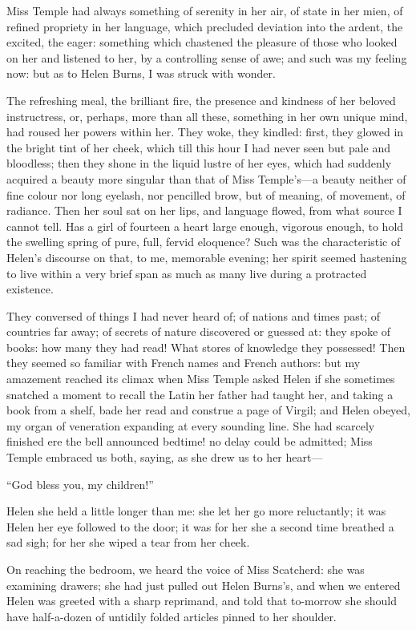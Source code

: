 Miss Temple had always something of serenity in her air, of state in her
mien, of refined propriety in her language, which precluded deviation
into the ardent, the excited, the eager: something which chastened the
pleasure of those who looked on her and listened to her, by a
controlling sense of awe; and such was my feeling now: but as to Helen
Burns, I was struck with wonder.

The refreshing meal, the brilliant fire, the presence and kindness of
her beloved instructress, or, perhaps, more than all these, something in
her own unique mind, had roused her powers within her. They woke, they
kindled: first, they glowed in the bright tint of her cheek, which till
this hour I had never seen but pale and bloodless; then they shone in
the liquid lustre of her eyes, which had suddenly acquired a beauty more
singular than that of Miss Temple's---a beauty neither of fine colour
nor long eyelash, nor pencilled brow, but of meaning, of movement, of
radiance. Then her soul sat on her lips, and language flowed, from what
source I cannot tell. Has a girl of fourteen a heart large enough,
vigorous enough, to hold the swelling spring of pure, full, fervid
eloquence? Such was the characteristic of Helen's discourse on that, to
me, memorable evening; her spirit seemed hastening to live within a very
brief span as much as many live during a protracted existence.

They conversed of things I had never heard of; of nations and times
past; of countries far away; of secrets of nature discovered or guessed
at: they spoke of books: how many they had read! What stores of
knowledge they possessed! Then they seemed so familiar with French
names and French authors: but my amazement reached its climax when Miss
Temple asked Helen if she sometimes snatched a moment to recall the
Latin her father had taught her, and taking a book from a shelf, bade
her read and construe a page of Virgil; and Helen obeyed, my organ of
veneration expanding at every sounding line. She had scarcely finished
ere the bell announced bedtime! no delay could be admitted; Miss Temple
embraced us both, saying, as she drew us to her heart---

\enquote{God bless you, my children!}

Helen she held a little longer than me: she let her go more reluctantly;
it was Helen her eye followed to the door; it was for her she a second
time breathed a sad sigh; for her she wiped a tear from her cheek.

On reaching the bedroom, we heard the voice of Miss Scatcherd: she was
examining drawers; she had just pulled out Helen Burns's, and when we
entered Helen was greeted with a sharp reprimand, and told that
to-morrow she should have half-a-dozen of untidily folded articles
pinned to her shoulder.

